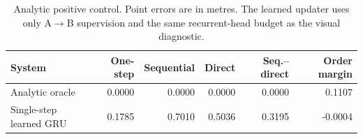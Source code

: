 \begin{table}[t]
\centering
\small
\caption{Analytic positive control. Point errors are in metres. The learned updater uses only A$\rightarrow$B supervision and the same recurrent-head budget as the visual diagnostic.}
\label{tab:se3_positive}
\begin{tabular}{lrrrrr}
\toprule
System & One-step & Sequential & Direct & Seq.--direct & Order margin \\
\midrule
Analytic oracle & 0.0000 & 0.0000 & 0.0000 & 0.0000 & 0.1107 \\
Single-step learned GRU & 0.1785 & 0.7010 & 0.5036 & 0.3195 & -0.0004 \\
\bottomrule
\end{tabular}
\end{table}
